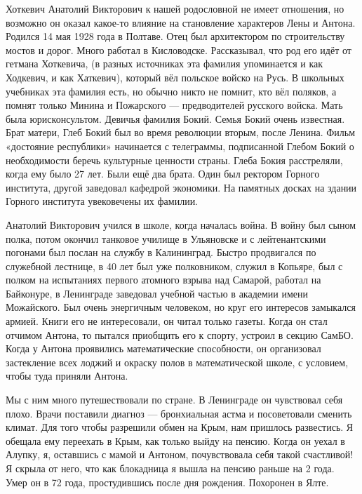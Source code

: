 {\sloppy

Хоткевич Анатолий Викторович к нашей родословной не имеет отношения, но возможно он оказал какое-то влияние на становление характеров  Лены и Антона.
Родился 14 мая 1928 года в Полтаве.
Отец был архитектором по строительству мостов и дорог.
Много работал в Кисловодске.
Рассказывал, что род его идёт от гетмана Хоткевича, (в разных источниках эта фамилия упоминается и как Ходкевич, и как Хаткевич), который вёл польское войско на Русь.
В школьных учебниках эта фамилия есть, но обычно никто не помнит, кто вёл поляков, а помнят только Минина и Пожарского --- предводителей русского войска.
Мать была юрисконсультом.
Девичья фамилия Бокий.
Семья Бокий очень известная.
Брат матери, Глеб Бокий был во время революции вторым, после Ленина.
Фильм «достояние республики» начинается с телеграммы, подписанной Глебом Бокий о необходимости беречь культурные ценности страны.
Глеба Бокия расстреляли, когда ему было 27 лет.
Были ещё два брата.
Один был ректором Горного института, другой заведовал кафедрой экономики.
На памятных досках на здании Горного института увековечены их фамилии.

}

Анатолий Викторович учился в школе, когда началась война.
В войну был сыном полка, потом окончил танковое училище в Ульяновске и с лейтенантскими погонами был послан на службу в Калининград.
Быстро продвигался по служебной лестнице, в 40 лет был уже полковником, служил в Копьяре, был с полком на испытаниях первого атомного взрыва над Самарой, работал на Байконуре, в Ленинграде заведовал учебной частью в академии имени
Можайского.
Был очень энергичным человеком, но круг его интересов замыкался армией.
Книги его не интересовали, он читал только газеты.
Когда он стал отчимом Антона, то пытался приобщить его к спорту, устроил в секцию СамБО.
Когда у Антона проявились математические способности, он организовал застекление всех лоджий и окраску полов в математической школе, с условием, чтобы туда приняли Антона.

Мы с ним много путешествовали по стране.
В Ленинграде он чувствовал себя плохо.
Врачи поставили диагноз --- бронхиальная астма и посоветовали сменить климат.
Для того чтобы разрешили обмен на Крым, нам пришлось развестись.
Я обещала ему переехать в Крым, как только выйду на пенсию.
Когда он уехал в Алупку, я, оставшись с мамой и Антоном, почувствовала себя такой счастливой! Я скрыла от него, что как блокадница я вышла на пенсию раньше на 2 года.
Умер он в 72 года, простудившись после дня рождения.
Похоронен в Ялте.
